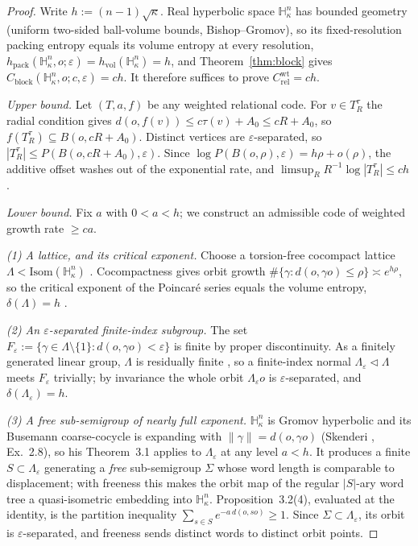 \documentclass[11pt,reqno]{amsart}
\theoremstyle{plain}
\theoremstyle{definition}
\newcommand{\hpack}{h_{\mathrm{pack}}}
\newcommand{\hvol}{h_{\mathrm{vol}}}
\newcommand{\Crel}{C_{\mathrm{rel}}}
\newcommand{\Cblock}{C_{\mathrm{block}}}
\newcommand{\Hk}{\mathbb{H}^n_\kappa}
\newcommand{\eps}{\varepsilon}
\begin{document}
\begin{proof}
Write $h:=(n-1)\sqrt\kappa$. Real hyperbolic space $\Hk$ has bounded geometry (uniform two-sided ball-volume bounds, Bishop--Gromov), so its fixed-resolution packing entropy equals its volume entropy at every resolution, $\hpack(\Hk,o;\eps)=\hvol(\Hk)=h$, and Theorem~\ref{thm:block} gives $\Cblock(\Hk,o;c,\eps)=ch$. It therefore suffices to prove $\Crel^{\mathrm{wt}}=ch$.

\smallskip
\noindent\emph{Upper bound.} Let $(T,a,f)$ be any weighted relational code. For $v\in T_R^\tau$ the radial condition gives $d(o,f(v))\le c\tau(v)+A_0\le cR+A_0$, so $f(T_R^\tau)\subseteq B(o,cR+A_0)$. Distinct vertices are $\eps$-separated, so $|T_R^\tau|\le P(B(o,cR+A_0),\eps)$. Since $\log P(B(o,\rho),\eps)=h\rho+o(\rho)$, the additive offset washes out of the exponential rate, and $\limsup_R R^{-1}\log|T_R^\tau|\le ch$.

\smallskip
\noindent\emph{Lower bound.} Fix $a$ with $0<a<h$; we construct an admissible code of weighted growth rate $\ge ca$.

\emph{(1) A lattice, and its critical exponent.} Choose a torsion-free cocompact lattice $\Lambda<\mathrm{Isom}(\Hk)$ \cite{borel1963}. Cocompactness gives orbit growth $\#\{\gamma:d(o,\gamma o)\le\rho\}\asymp e^{h\rho}$, so the critical exponent of the Poincar\'e series equals the volume entropy, $\delta(\Lambda)=h$ \cite{patterson1976,sullivan1979}.

\emph{(2) An $\eps$-separated finite-index subgroup.} The set $F_\eps:=\{\gamma\in\Lambda\setminus\{1\}:d(o,\gamma o)<\eps\}$ is finite by proper discontinuity. As a finitely generated linear group, $\Lambda$ is residually finite \cite{malcev1940}, so a finite-index normal $\Lambda_\eps\triangleleft\Lambda$ meets $F_\eps$ trivially; by invariance the whole orbit $\Lambda_\eps o$ is $\eps$-separated, and $\delta(\Lambda_\eps)=h$.

\emph{(3) A free sub-semigroup of nearly full exponent.} $\Hk$ is Gromov hyperbolic and its Busemann coarse-cocycle is expanding with $\|\gamma\|=d(o,\gamma o)$ (Skenderi \cite{skenderi2026}, Ex.~2.8), so his Theorem~3.1 applies to $\Lambda_\eps$ at any level $a<h$. It produces a finite $S\subset\Lambda_\eps$ generating a \emph{free} sub-semigroup $\Sigma$ whose word length is comparable to displacement; with freeness this makes the orbit map of the regular $|S|$-ary word tree a quasi-isometric embedding into $\Hk$. Proposition~3.2(4), evaluated at the identity, is the partition inequality $\sum_{s\in S}e^{-a\,d(o,so)}\ge1$. Since $\Sigma\subset\Lambda_\eps$, its orbit is $\eps$-separated, and freeness sends distinct words to distinct orbit points.


\end{proof}
\end{document}
